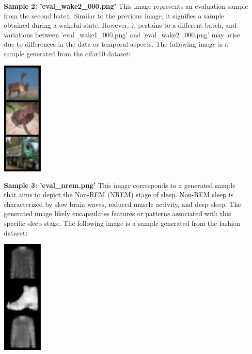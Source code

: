 \documentclass{midl} %
\begin{document}
\textbf{Sample 2: 'eval\_wake2\_000.png'}
This image represents an evaluation sample from the second batch. Similar to the previous image, it signifies a sample obtained during a wakeful state. However, it pertains to a different batch, and variations between 'eval\_wake1\_000.png' and 'eval\_wake2\_000.png' may arise due to differences in the data or temporal aspects. The following image is a sample generated from the cifar10 dataset:
\begin{center}
\includegraphics[width=0.15\textwidth]{eval_wake2_000.png}\hfill
\end{center}

\textbf{Sample 3: 'eval\_nrem.png'}
This image corresponds to a generated sample that aims to depict the Non-REM (NREM) stage of sleep. Non-REM sleep is characterized by slow brain waves, reduced muscle activity, and deep sleep. The generated image likely encapsulates features or patterns associated with this specific sleep stage. The following image is a sample generated from the fashion dataset:
\begin{center}
\includegraphics[width=0.15\textwidth]{eval3_nrem.png}\hfill
\end{center}
\end{document}
